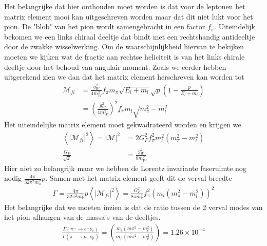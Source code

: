 \documentclass[../main.tex]{subfiles}
\begin{document}
Het belangrijke dat hier onthouden moet worden is dat voor de leptonen het matrix element mooi kan uitgeschreven worden maar dat dit niet lukt voor het pion. De "blob" van het pion wordt samengebracht in een factor $f_\pi$. Uiteindelijk bekomen we een links chiraal deeltje dat bindt met een rechtshandig antideeltje door de zwakke wisselwerking. Om de waarschijnlijkheid hiervan te bekijken moeten we kijken wat de fractie aan rechtse heliciteit is van het links chirale deeltje door het behoud van angulair moment. Zoals we eerder hebben uitgerekend zien we dan dat het matrix element herschreven kan worden tot
\begin{equation}
    \begin{aligned}
        \label{eq:pion_verval_matrix_final}
        \mathcal{M}_{fi} &= \frac{g_W^2}{4m_W^2} f_\pi m_\pi \sqrt{E_l+m_l}\sqrt{p}\left( 1 - \frac{p}{E_l+m_l} \right)\\
                         &= \left( \frac{g_W^2}{4m_W^2} \right)^2 f_\pi m_l \sqrt{m_\pi^2-m_l^2}
    \end{aligned}
\end{equation}
Het uiteindelijke matrix element moet gekwadrateerd worden en krijgen we 
\begin{equation}
    \begin{aligned}
        \label{eq:pion_verval_matrix_final_kwad}
        \left<|\mathcal{M}_{fi}|^2\right> = |\mathcal{M}|^2 &= 2G_F^2 f_\pi^2m_l^2(m_\pi^2-m_l^2)\\
        \frac{G_F}{\sqrt{2}} &= \frac{g_W^2}{8m_W^2}
    \end{aligned}
\end{equation}
Hier niet zo belangrijk maar we hebben de Lorentz invariante faseruimte nog nodig $ \frac{4\pi}{32\pi^2m_\pi^2} p$. Samen met het matrix element geeft dit de verval breedte
\begin{equation}
    \begin{aligned}
        \label{eq:pion_verval_breedte}
        \Gamma = \frac{4\pi}{32\pi^2m_\pi^2} p \left<|\mathcal{M}_{fi}|^2\right> = \frac{G_F^2}{8\pi m_\pi^3} f_\pi^2 \left( m_l(m_\pi^2-m_l^2) \right)^2
    \end{aligned}
\end{equation}
Het belangrijke dat we moeten inzien is dat de ratio tussen de 2 verval modes van het pion afhangen van de massa's van de deeltjes.
\begin{equation}
    \begin{aligned}
        \label{eq:pion_verval_ratio}
        \frac{\Gamma(\pi^- \rightarrow e^-\overline \nu_e)}{\Gamma(\pi^- \rightarrow \mu^-\overline \nu_\mu)}  = \left( \frac{m_e(m\pi^2 - m_e^2)}{m_\mu(m\pi^2 - m_\mu^2)} \right) = 1.26 \times 10^{-4}
    \end{aligned}
\end{equation}
\end{document}

